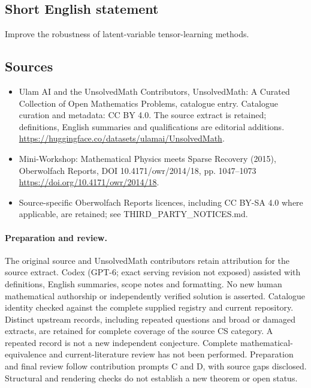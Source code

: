 \documentclass[11pt]{article}
\begin{document}
\subsection{Short English statement}
Improve the robustness of latent-variable tensor-learning methods.
\subsection{Sources}
\begin{itemize}
\item[\hypertarget{source:statement:1}{S1}] Ulam AI and the UnsolvedMath Contributors, UnsolvedMath: A Curated Collection of Open Mathematics Problems, catalogue entry. Catalogue curation and metadata: CC BY 4.0. The source extract is retained; definitions, English summaries and qualifications are editorial additions.
\url{https://huggingface.co/datasets/ulamai/UnsolvedMath}.
\item[\hypertarget{source:statement:2}{S2}] Mini-Workshop: Mathematical Physics meets Sparse Recovery (2015), Oberwolfach Reports, DOI 10.4171/owr/2014/18, pp. 1047--1073
\url{https://doi.org/10.4171/owr/2014/18}.
\item Source-specific Oberwolfach Reports licences, including CC BY-SA 4.0 where applicable, are retained; see THIRD\_PARTY\_NOTICES.md.
\end{itemize}
\paragraph{Preparation and review.}
The original source and UnsolvedMath contributors retain attribution for the source extract. Codex (GPT-6; exact serving revision not exposed) assisted with definitions, English summaries, scope notes and formatting. No new human mathematical authorship or independently verified solution is asserted. Catalogue identity checked against the complete supplied registry and current repository. Distinct upstream records, including repeated questions and broad or damaged extracts, are retained for complete coverage of the source CS category. A repeated record is not a new independent conjecture. Complete mathematical-equivalence and current-literature review has not been performed. Preparation and final review follow contribution prompts C and D, with source gaps disclosed. Structural and rendering checks do not establish a new theorem or open status.
\label{end:statement}
\end{document}
